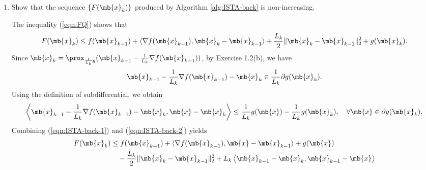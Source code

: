 \begin{exercise}
\begin{center}
\begin{minipage}{0.9\linewidth}
\begin{algorithm}[H]
\begin{algorithmic}[1]
                \end{algorithmic}
            \end{algorithm}
        \end{minipage}
    \end{center}

    \begin{enumerate}
        \item Show that the sequence $\{F(\mb{x}_k)\}$ produced by Algorithm \ref{alg:ISTA-back} is non-increasing.

            \begin{solution}
                The inequality (\ref{eqn:FQ}) shows that
                \begin{align}\label{eqn:ISTA-back-1}
                    F(\mb{x}_k)\le f(\mb{x}_{k-1}) + \langle \nabla f(\mb{x}_{k-1}), \mb{x}_k - \mb{x}_{k-1} \rangle + \frac{L_k}{2}\|\mb{x}_k - \mb{x}_{k-1}\|_2^2 + g(\mb{x}_k).
                \end{align}
                Since $\mb{x}_k = \prox_{\frac{1}{L_k}g}(\mb{x}_{k-1} - \frac{1}{L_k}\nabla f(\mb{x}_{k-1}))$, by Exercise 1.2(b), we have
                \begin{align*}
                    \mb{x}_{k-1} - \frac{1}{L_k}\nabla f(\mb{x}_{k-1}) - \mb{x}_k \in \frac{1}{L_k}\partial g(\mb{x}_k).
                \end{align*}
                Using the definition of subdifferential, we obtain
                \begin{align}\label{eqn:ISTA-back-2}
                    \left\langle \mb{x}_{k-1} - \frac{1}{L_k}\nabla f(\mb{x}_{k-1}) - \mb{x}_k, \mb{x} - \mb{x}_k \right\rangle \le \frac{1}{L_k}g(\mb{x}) - \frac{1}{L_k}g(\mb{x}_k), \quad \forall \mb{x} \in \partial g(\mb{x}_k).
                \end{align}
                Combining (\ref{eqn:ISTA-back-1}) and (\ref{eqn:ISTA-back-2}) yields
                \begin{align}
                    \label{eqn:ISTA-back-3}
                    \begin{aligned}
                        F(\mb{x}_k) & \le f(\mb{x}_{k-1})  + \langle \nabla f(\mb{x}_{k-1}), \mb{x} - \mb{x}_{k-1} \rangle + g(\mb{x})                                             \\
                                    & \quad - \frac{L_k}{2}\|\mb{x}_k - \mb{x}_{k-1}\|_2^2 + L_k \left\langle \mb{x}_{k-1} - \mb{x}_k, \mb{x}_{k-1} - \mb{x} \right\rangle         \\

\end{aligned}
\end{align}
\end{solution}
\end{enumerate}
\end{exercise}
